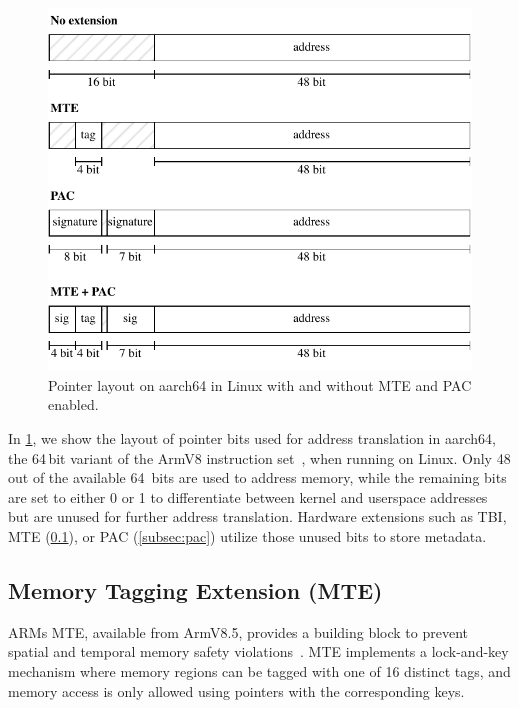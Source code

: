 \begin{figure}[t]
    \centering
    \includegraphics[scale=1]{figures/build/pointer-aarch64}
    \caption{Pointer layout on aarch64 in Linux with and without \ac{MTE} and \ac{PAC} enabled.}
    \label{fig:aarch64-pointer}
\end{figure}

In \cref{fig:aarch64-pointer}, we show the layout of pointer bits used for address translation in aarch64, the 64\,bit variant of the ArmV8 instruction set~\cite{ARMA2024Arch64}, when running on Linux.
Only 48 out of the available 64\ bits are used to address memory, while the remaining bits are set to either 0 or 1 to differentiate between kernel and userspace addresses but are unused for further address translation.
Hardware extensions such as \ac{TBI}, \ac{MTE} (\cref{subsec:mte}), or \ac{PAC} (\cref{subsec:pac}) utilize those unused bits to store metadata.

\subsection{Memory Tagging Extension (MTE)}
\label{subsec:mte}

ARMs \Ac{MTE}, available from ArmV8.5, provides a building block to prevent spatial and temporal memory safety violations~\cite{ARM2019MTE}.
\Ac{MTE} implements a lock-and-key mechanism where memory regions can be tagged with one of 16 distinct tags, and memory access is only allowed using pointers with the corresponding keys.

